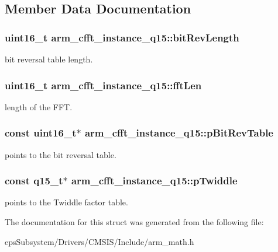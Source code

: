 \subsection{Member Data Documentation}
\hypertarget{structarm__cfft__instance__q15_a738907cf34bdbbaf724414ac2decbc3c}{
\subsubsection[{bit\-Rev\-Length}]{\setlength{\rightskip}{0pt plus 5cm}uint16\-\_\-t arm\-\_\-cfft\-\_\-instance\-\_\-q15\-::bit\-Rev\-Length}}\label{structarm__cfft__instance__q15_a738907cf34bdbbaf724414ac2decbc3c}
bit reversal table length. \hypertarget{structarm__cfft__instance__q15_a5f9e1d3a8c127ee323b5e6929aeb90df}{
\subsubsection[{fft\-Len}]{\setlength{\rightskip}{0pt plus 5cm}uint16\-\_\-t arm\-\_\-cfft\-\_\-instance\-\_\-q15\-::fft\-Len}}\label{structarm__cfft__instance__q15_a5f9e1d3a8c127ee323b5e6929aeb90df}
length of the F\-F\-T. \hypertarget{structarm__cfft__instance__q15_ac9160b80243b99a0b6e2f75ddb5cf0ae}{
\subsubsection[{p\-Bit\-Rev\-Table}]{\setlength{\rightskip}{0pt plus 5cm}const uint16\-\_\-t$\ast$ arm\-\_\-cfft\-\_\-instance\-\_\-q15\-::p\-Bit\-Rev\-Table}}\label{structarm__cfft__instance__q15_ac9160b80243b99a0b6e2f75ddb5cf0ae}
points to the bit reversal table. \hypertarget{structarm__cfft__instance__q15_afdaf12ce4687cec021c5ae73d0987a3f}{
\subsubsection[{p\-Twiddle}]{\setlength{\rightskip}{0pt plus 5cm}const q15\-\_\-t$\ast$ arm\-\_\-cfft\-\_\-instance\-\_\-q15\-::p\-Twiddle}}\label{structarm__cfft__instance__q15_afdaf12ce4687cec021c5ae73d0987a3f}
points to the Twiddle factor table. 

The documentation for this struct was generated from the following file\-:\begin{DoxyCompactItemize}
\item 
eps\-Subsystem/\-Drivers/\-C\-M\-S\-I\-S/\-Include/arm\-\_\-math.\-h\end{DoxyCompactItemize}
